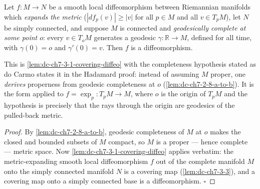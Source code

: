 \begin{lemma}
  \label{lem:dc-ch7-3-1-assembly}
  \leanok
  Let $f:M\to N$ be a smooth local diffeomorphism between Riemannian manifolds which
  \emph{expands the metric} ($|df_p(v)|\ge|v|$ for all $p\in M$ and all $v\in T_pM$), let
  $N$ be simply connected, and suppose $M$ is connected and \emph{geodesically complete at
  some point $o$}: every $v\in T_oM$ generates a geodesic $\gamma:\mathbb R\to M$, defined
  for all time, with $\gamma(0)=o$ and $\gamma'(0)=v$. Then $f$ is a diffeomorphism.

  This is \cref{lem:dc-ch7-3-1-covering-diffeo} with the completeness hypothesis stated as
  do Carmo states it in the Hadamard proof: instead of assuming $M$ proper, one \emph{derives}
  properness from geodesic completeness at $o$ (\cref{lem:dc-ch7-2-8-a-to-b}). It is the form
  applied to $f=\exp_p:T_pM\to M$, where $o$ is the origin of $T_pM$ and the hypothesis is
  precisely that the rays through the origin are geodesics of the pulled-back metric.
\end{lemma}
\begin{proof}
  \leanok
  By \cref{lem:dc-ch7-2-8-a-to-b}, geodesic completeness of $M$ at $o$ makes the closed and
  bounded subsets of $M$ compact, so $M$ is a proper — hence complete — metric space. Now
  \cref{lem:dc-ch7-3-1-covering-diffeo} applies verbatim: the metric-expanding smooth local
  diffeomorphism $f$ out of the complete manifold $M$ onto the simply connected manifold $N$
  is a covering map (\cref{lem:dc-ch7-3-3}), and a covering map onto a simply connected base
  is a diffeomorphism. $\square$
\end{proof}

